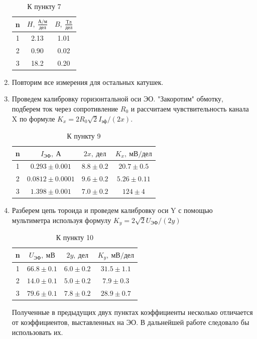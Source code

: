 \documentclass[14pt, a4paper]{report}
\begin{document}
\begin{enumerate}
\begin{table}[h!]
\centering
\begin{tabular}{| c | c | c |}
\hline
n & $H,\ \frac{А/м}{дел}$ & $B,\ \frac{Тл}{дел}$ \\
\hline
1 & 2.13 & 1.01 \\
2 & 0.90 & 0.02 \\
3 & 18.2 & 0.20 \\
\hline
\end{tabular}
\caption{К пункту 7}
\end{table}

\item Повторим все измерения для остальных катушек.

\item Проведем калибровку горизонтальной оси ЭО. "Закоротим" обмотку, подберем ток через сопротивление $R_0$ и рассчитаем чувствительность канала X по формуле $K_x=2R_0\sqrt{2}I_{эф}/(2x)$.

\begin{table}[h!]
\centering
\begin{tabular}{| c | c | c | c |}
\hline
n & $I_{ЭФ},\ А$ & $2x,\ дел$ & $K_x,\ мВ/дел$ \\
\hline
1 & $0.293\pm0.001$ & $8.8\pm0.2$ & $20.7\pm0.5$ \\
2 & $0.0812\pm0.0001$ & $9.6\pm0.2$ & $5.26\pm0.11$ \\
3 & $1.398\pm0.001$ & $7.0\pm0.2$ & $124\pm4$ \\
\hline
\end{tabular}
\caption{К пункту 9}
\end{table}

\item Разберем цепь тороида и проведем калибровку оси Y с помощью мультиметра используя формулу $K_y=2\sqrt{2}U_{ЭФ}/(2y)$

\begin{table}[h!]
\centering
\begin{tabular}{| c | c | c | c |}
\hline
n & $U_{ЭФ},\ мВ$ & $2y,\ дел$ & $K_y,\ мВ/дел$ \\
\hline
1 & $66.8\pm0.1$ & $6.0\pm0.2$ & $31.5\pm1.1$ \\
2 & $14.0\pm0.1$ & $5.0\pm0.2$ & $7.9\pm0.3$ \\
3 & $79.6\pm0.1$ & $7.8\pm0.2$ & $28.9\pm0.7$ \\
\hline
\end{tabular}
\caption{К пункту 10}
\end{table}

Полученные в предыдущих двух пунктах коэффициенты несколько отличается от коэффициентов, выставленных на ЭО. В дальнейшей работе следовало бы использовать их.


\end{enumerate}
\end{document}
